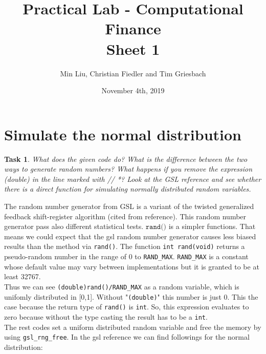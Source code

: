 \documentclass{scrartcl}
\newtheorem{task}{Task}
\begin{document}
	\title{Practical Lab - Computational Finance \\ Sheet 1}
	\author{Min Liu, Christian Fiedler and Tim Griesbach}
	\date{November 4th, 2019}
	\maketitle
	
	\section*{Simulate the normal distribution}
	\begin{task}
		What does the given code do? What is the difference between the two ways to generate random
		numbers? What happens if you remove the expression (double) in the line marked with // *? Look
		at the GSL reference and see whether there is a direct function for simulating normally distributed
		random variables.
	\end{task}
	The random number generator from GSL is a variant of the twisted generalized feedback shift-register algorithm (cited from reference). This random number generator pass also different statistical tests. $\texttt{rand()}$ is a simpler functions. That means we could expect that the gsl random number generator causes less biased results than the method via \texttt{rand()}. 
	The function \texttt{int rand(void)}
	returns a pseudo-random number in the range of 0 to \texttt{RAND\_MAX}.
	\texttt{RAND\_MAX} is a constant whose default value may vary 
	between implementations but it is granted to be at least 32767.\\
	Thus we can see  \texttt{(double)rand()/RAND\_MAX} as a random variable, which is unifomly distributed in [0,1]. Without "\texttt{(double)}" this number is just 0. This the case because the return type of \texttt{rand()} is \texttt{int}. So, this expression evaluates to zero because without the type casting the result has to be a \texttt{int}.\\
	The rest codes set a uniform distributed random variable and free the memory by using \texttt{gsl\_rng\_free}. In the gsl reference we can find followings for the normal distribution: 
\end{document}
